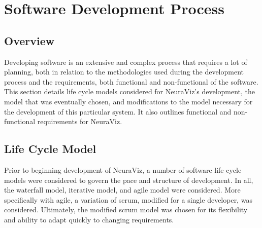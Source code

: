 \section{Software Development Process}
\label{sec:SoftwareDevelopmentProcess}

\subsection{Overview} 
Developing software is an extensive and complex process that requires a lot of planning, both in relation to the methodologies used during the development process and the requirements, both functional and non-functional of the software. This section details life cycle models considered for NeuraViz's development, the model that was eventually chosen, and modifications to the model necessary for the development of this particular system. It also outlines functional and non-functional requirements for NeuraViz.

\subsection{Life Cycle Model}
Prior to beginning development of NeuraViz, a number of software life cycle models were considered to govern the pace and structure of development. In all, the waterfall model, iterative model, and agile model were considered. More specifically with agile, a variation of scrum, modified for a single developer, was considered. Ultimately, the modified scrum model was chosen for its flexibility and ability to adapt quickly to changing requirements.

